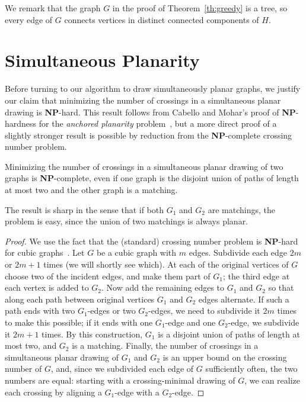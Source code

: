 \documentclass{llncs}
\newcommand{\NP}{\mbox{\bfseries NP}}
\begin{document}
We remark that the graph $G$ in the proof of Theorem~\ref{th:greedy} is a tree, so every edge of $G$ connects vertices in distinct connected components of $H$.



\section{Simultaneous Planarity}
\label{sec:S2}



Before turning to our algorithm to draw simultaneously planar graphs, we justify our claim that minimizing the number of crossings in a simultaneous planar drawing is \NP-hard. This result follows from Cabello and Mohar's proof of  \NP-hardness for the \emph{anchored planarity} problem~\cite[Theorem 2.1]{Cabello-Mohar}, but a more direct proof of a slightly stronger result is possible by reduction from the \NP-complete crossing number problem.

\begin{theorem}\label{thm:SPC}
 Minimizing the number of crossings in a simultaneous planar drawing of two graphs is \NP-complete, even if one graph is the disjoint union of paths of length at most two and the other graph is a matching.
\end{theorem}

The result is sharp in the sense that if both $G_1$ and $G_2$ are matchings, the problem is easy, since the union of two matchings is always planar.

\begin{proof}
We use the fact that the (standard) crossing number problem is \NP-hard for cubic graphs~\cite{H06}. Let $G$ be a cubic graph with $m$ edges.
Subdivide each edge $2m$ or $2m+1$ times (we will shortly see which). At each of the original vertices of $G$ choose two of the incident edges, and make them part of $G_1$; the third edge at each vertex is added to $G_2$. Now add the remaining edges to $G_1$ and $G_2$ so that along each path between original vertices $G_1$ and $G_2$ edges alternate. If such a path ends with two $G_1$-edges or two $G_2$-edges, we need to subdivide it $2m$ times to make this possible; if it ends with one $G_1$-edge and one $G_2$-edge, we subdivide it $2m+1$ times. By this construction, $G_1$ is a disjoint union of paths of length at most two, and $G_2$ is a matching. Finally, the number of crossings in a simultaneous planar drawing of $G_1$ and $G_2$ is an upper bound on the crossing number of $G$, and, since we subdivided each edge of $G$ sufficiently often, the two numbers are equal: starting with a crossing-minimal drawing of $G$, we can realize each crossing by aligning a $G_1$-edge with a $G_2$-edge.
\end{proof}
\end{document}

